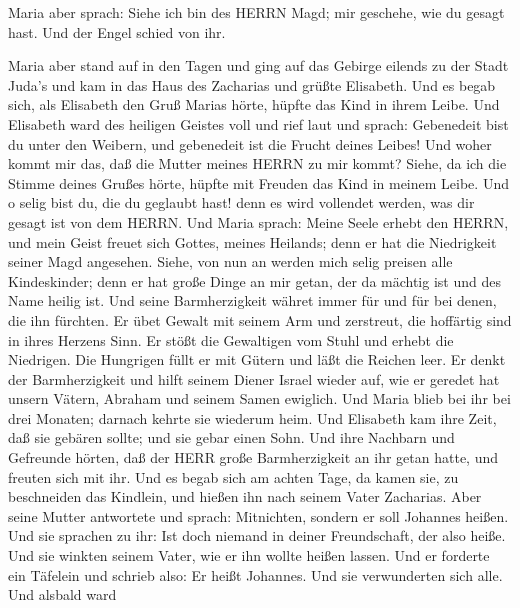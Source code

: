  Maria aber sprach: Siehe ich bin des HERRN Magd; mir
geschehe, wie du gesagt hast. Und der Engel schied von ihr.

 Maria aber stand auf in den Tagen und ging auf das Gebirge
eilends zu der Stadt Juda's  und kam in das Haus des
Zacharias und grüßte Elisabeth.  Und es begab sich, als
Elisabeth den Gruß Marias hörte, hüpfte das Kind in ihrem Leibe. Und
Elisabeth ward des heiligen Geistes voll  und rief laut und
sprach: Gebenedeit bist du unter den Weibern, und gebenedeit ist die
Frucht deines Leibes!  Und woher kommt mir das, daß die
Mutter meines HERRN zu mir kommt?  Siehe, da ich die Stimme
deines Grußes hörte, hüpfte mit Freuden das Kind in meinem Leibe.
 Und o selig bist du, die du geglaubt hast! denn es wird
vollendet werden, was dir gesagt ist von dem HERRN.  Und
Maria sprach: Meine Seele erhebt den HERRN,  und mein Geist
freuet sich Gottes, meines Heilands;  denn er hat die
Niedrigkeit seiner Magd angesehen. Siehe, von nun an werden mich selig
preisen alle Kindeskinder;  denn er hat große Dinge an mir
getan, der da mächtig ist und des Name heilig ist.  Und
seine Barmherzigkeit währet immer für und für bei denen, die ihn
fürchten.  Er übet Gewalt mit seinem Arm und zerstreut, die
hoffärtig sind in ihres Herzens Sinn.  Er stößt die
Gewaltigen vom Stuhl und erhebt die Niedrigen.  Die
Hungrigen füllt er mit Gütern und läßt die Reichen leer. 
Er denkt der Barmherzigkeit und hilft seinem Diener Israel wieder auf,
 wie er geredet hat unsern Vätern, Abraham und seinem Samen
ewiglich.  Und Maria blieb bei ihr bei drei Monaten;
darnach kehrte sie wiederum heim.  Und Elisabeth kam ihre
Zeit, daß sie gebären sollte; und sie gebar einen Sohn. 
Und ihre Nachbarn und Gefreunde hörten, daß der HERR große
Barmherzigkeit an ihr getan hatte, und freuten sich mit ihr.
 Und es begab sich am achten Tage, da kamen sie, zu
beschneiden das Kindlein, und hießen ihn nach seinem Vater Zacharias.
 Aber seine Mutter antwortete und sprach: Mitnichten,
sondern er soll Johannes heißen.  Und sie sprachen zu ihr:
Ist doch niemand in deiner Freundschaft, der also heiße. 
Und sie winkten seinem Vater, wie er ihn wollte heißen lassen.
 Und er forderte ein Täfelein und schrieb also: Er heißt
Johannes. Und sie verwunderten sich alle.  Und alsbald ward
